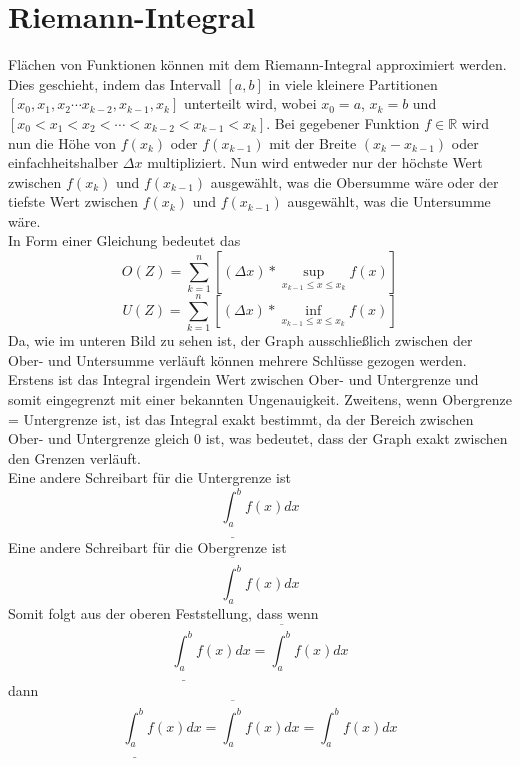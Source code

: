 \documentclass[fontsize=12pt,paper=a4,DIV12,cleardoublepage=empty, 
liststotoc,idxtotoc,bibtotoc]{article}
\newcommand{\RR}{\mathbb{R}}
\theoremstyle{plain}
\theoremstyle{definition}
\begin{document}
	\section{Riemann-Integral}	
	Flächen von Funktionen können mit dem Riemann-Integral approximiert werden. Dies geschieht, indem das Intervall $[a, b]$ in viele kleinere Partitionen $[x_0, x_1, x_2 \cdots x_{k-2}, x_{k-1}, x_k]$ unterteilt wird, wobei $x_0 = a$, $x_k = b$ und $[x_0 < x_1 < x_2 < \cdots < x_{k-2} < x_{k-1} < x_k]$. Bei gegebener Funktion $f \in \RR$ wird nun die Höhe von $f(x_k)$ oder $f(x_{k-1})$ mit der Breite $(x_k-x_{k-1})$ oder einfachheitshalber $\Delta x$ multipliziert. Nun wird entweder nur der höchste Wert zwischen $f(x_k)$ und $f(x_{k-1})$ ausgewählt, was die Obersumme wäre oder der tiefste Wert zwischen $f(x_k)$ und $f(x_{k-1})$ ausgewählt, was die Untersumme wäre.\\
	 In Form einer Gleichung bedeutet das
	\begin{equation*}
		O(Z)= \sum_{k=1}^{n} [(\Delta x)* \sup_{x_{k-1} \leq x \leq x_k} f(x)]
	\end{equation*}
	\begin{equation*}
		U(Z)= \sum_{k=1}^{n} [(\Delta x)* \inf_{x_{k-1} \leq x \leq x_k} f(x)]
	\end{equation*}
	Da, wie im unteren Bild zu sehen ist, der Graph ausschließlich zwischen der Ober- und Untersumme verläuft können mehrere Schlüsse gezogen werden. Erstens ist das Integral irgendein Wert zwischen Ober- und Untergrenze und somit eingegrenzt mit einer bekannten Ungenauigkeit. Zweitens, wenn Obergrenze = Untergrenze ist, ist das Integral exakt bestimmt, da der Bereich zwischen Ober- und Untergrenze gleich 0 ist, was bedeutet, dass der Graph exakt zwischen den Grenzen verläuft. \\Eine andere Schreibart für die Untergrenze ist
	\begin{equation*}
	\underline{\int _{a}^{b}}f(x)dx
	\end{equation*}
	Eine andere Schreibart für die Obergrenze ist
	\begin{equation*}
	\overline{\int _{a}^{b}}f(x)dx
	\end{equation*}
	Somit folgt aus der oberen Feststellung, dass wenn
	\begin{equation*}
		\underline{\int _{a}^{b}}f(x)dx = \overline{\int _{a}^{b}}f(x)dx
	\end{equation*}
	dann
	\begin{equation*}
		\underline{\int _{a}^{b}}f(x)dx = \overline{\int _{a}^{b}}f(x)dx = \int_{a}^{b}f(x)dx
	\end{equation*}
\end{document}
